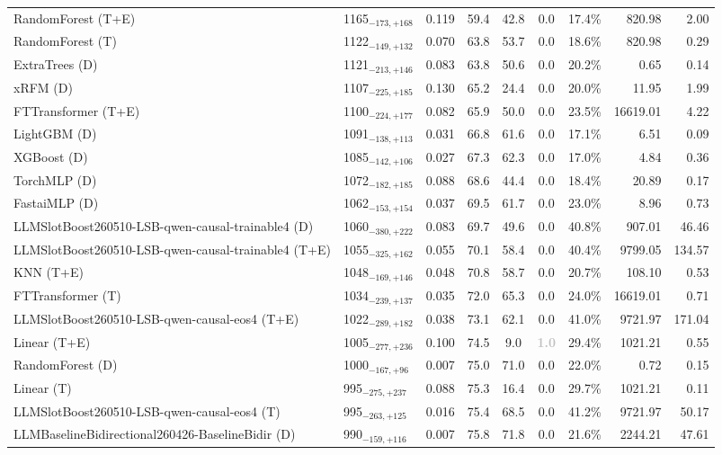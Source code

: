 \begin{tabular}{llcccccrr}
RandomForest (T+E) & 1165${}_{-173,+168}$ & 0.119 & 59.4 & 42.8 & 0.0 & 17.4\% & 820.98 & 2.00 \\
RandomForest (T) & 1122${}_{-149,+132}$ & 0.070 & 63.8 & 53.7 & 0.0 & 18.6\% & 820.98 & 0.29 \\
ExtraTrees (D) & 1121${}_{-213,+146}$ & 0.083 & 63.8 & 50.6 & 0.0 & 20.2\% & 0.65 & 0.14 \\
xRFM (D) & 1107${}_{-225,+185}$ & 0.130 & 65.2 & 24.4 & 0.0 & 20.0\% & 11.95 & 1.99 \\
FTTransformer (T+E) & 1100${}_{-224,+177}$ & 0.082 & 65.9 & 50.0 & 0.0 & 23.5\% & 16619.01 & 4.22 \\
LightGBM (D) & 1091${}_{-138,+113}$ & 0.031 & 66.8 & 61.6 & 0.0 & 17.1\% & 6.51 & 0.09 \\
XGBoost (D) & 1085${}_{-142,+106}$ & 0.027 & 67.3 & 62.3 & 0.0 & 17.0\% & 4.84 & 0.36 \\
TorchMLP (D) & 1072${}_{-182,+185}$ & 0.088 & 68.6 & 44.4 & 0.0 & 18.4\% & 20.89 & 0.17 \\
FastaiMLP (D) & 1062${}_{-153,+154}$ & 0.037 & 69.5 & 61.7 & 0.0 & 23.0\% & 8.96 & 0.73 \\
LLMSlotBoost260510-LSB-qwen-causal-trainable4 (D) & 1060${}_{-380,+222}$ & 0.083 & 69.7 & 49.6 & 0.0 & 40.8\% & 907.01 & 46.46 \\
LLMSlotBoost260510-LSB-qwen-causal-trainable4 (T+E) & 1055${}_{-325,+162}$ & 0.055 & 70.1 & 58.4 & 0.0 & 40.4\% & 9799.05 & 134.57 \\
KNN (T+E) & 1048${}_{-169,+146}$ & 0.048 & 70.8 & 58.7 & 0.0 & 20.7\% & 108.10 & 0.53 \\
FTTransformer (T) & 1034${}_{-239,+137}$ & 0.035 & 72.0 & 65.3 & 0.0 & 24.0\% & 16619.01 & 0.71 \\
LLMSlotBoost260510-LSB-qwen-causal-eos4 (T+E) & 1022${}_{-289,+182}$ & 0.038 & 73.1 & 62.1 & 0.0 & 41.0\% & 9721.97 & 171.04 \\
Linear (T+E) & 1005${}_{-277,+236}$ & 0.100 & 74.5 & 9.0 & \textcolor{silver}{\textbf{1.0}} & 29.4\% & 1021.21 & 0.55 \\
RandomForest (D) & 1000${}_{-167,+96}$ & 0.007 & 75.0 & 71.0 & 0.0 & 22.0\% & 0.72 & 0.15 \\
Linear (T) & 995${}_{-275,+237}$ & 0.088 & 75.3 & 16.4 & 0.0 & 29.7\% & 1021.21 & 0.11 \\
LLMSlotBoost260510-LSB-qwen-causal-eos4 (T) & 995${}_{-263,+125}$ & 0.016 & 75.4 & 68.5 & 0.0 & 41.2\% & 9721.97 & 50.17 \\
LLMBaselineBidirectional260426-BaselineBidir (D) & 990${}_{-159,+116}$ & 0.007 & 75.8 & 71.8 & 0.0 & 21.6\% & 2244.21 & 47.61 \\

\end{tabular}
